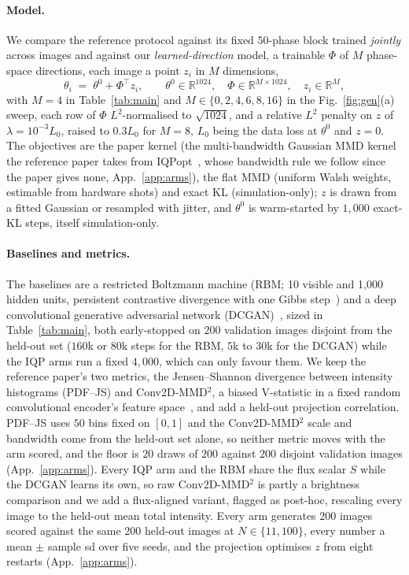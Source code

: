 \documentclass{article}
\begin{document}
\paragraph{Model.}
We compare the reference protocol against its fixed $50$-phase block trained \emph{jointly} across
images and against our \emph{learned-direction} model, a trainable $\Phi$ of $M$ phase-space
directions, each image a point $z_i$ in $M$ dimensions,
\begin{equation}
\theta_i \;=\; \theta^{0} + \Phi^{\!\top} z_i,
\qquad \theta^{0}\in\mathbb{R}^{1024},\quad
\Phi\in\mathbb{R}^{M\times 1024},\quad z_i \in \mathbb{R}^{M},
\label{eq:affine}
\end{equation}
with $M{=}4$ in Table~\ref{tab:main} and $M \in \{0,2,4,6,8,16\}$ in the Fig.~\ref{fig:gen}(a) sweep,
each row of $\Phi$ $L^2$-normalised to $\sqrt{1024}$, and a relative $L^2$ penalty on $z$ of
$\lambda = 10^{-3} L_{0}$, raised to $0.3 L_{0}$ for $M{=}8$, $L_{0}$ being the data loss at
$\theta^{0}$ and $z = 0$. The objectives are the paper kernel (the multi-bandwidth Gaussian
MMD kernel the reference paper takes from IQPopt~\cite{recio_2025_iqpopt}, whose bandwidth rule we
follow since the paper gives none, App.~\ref{app:arms}), the flat MMD (uniform Walsh weights,
estimable from hardware shots) and exact KL (simulation-only); $z$ is drawn from a fitted
Gaussian or resampled with jitter, and $\theta^{0}$ is warm-started by $1{,}000$ exact-KL steps,
itself simulation-only.

\paragraph{Baselines and metrics.}
The baselines are a restricted Boltzmann machine (RBM; 10 visible and 1{,}000 hidden units,
persistent contrastive divergence with one Gibbs
step~\cite{hinton_2002_training,tieleman_2008_training}) and a deep convolutional generative
adversarial network (DCGAN)~\cite{radford_2015_unsupervised}, sized in Table~\ref{tab:main}, both
early-stopped on $200$ validation images disjoint from the held-out set ($160$k or $80$k steps for
the RBM, $5$k to $30$k for the DCGAN) while the IQP arms run a fixed $4{,}000$, which can only favour
them. We keep the reference paper's two metrics, the Jensen--Shannon divergence between
intensity histograms (PDF--JS) and Conv2D-MMD$^2$, a biased V-statistic in a fixed random
convolutional encoder's feature space~\cite{gretton_2012_kernel}, and add a held-out projection
correlation. PDF--JS uses $50$ bins fixed on $[0,1]$ and the Conv2D-MMD$^2$ scale and bandwidth come
from the held-out set alone, so neither metric moves with the arm scored, and the floor is $20$ draws
of $200$ against $200$ disjoint validation images (App.~\ref{app:arms}). Every IQP arm and the RBM
share the
flux scalar $S$ while the DCGAN learns its own, so raw Conv2D-MMD$^2$ is partly a brightness
comparison and we add a flux-aligned variant, flagged as post-hoc, rescaling every image to the
held-out mean total intensity. Every arm generates 200 images scored against the same 200
held-out images at $N \in \{11,100\}$, every number a mean $\pm$ sample sd over five seeds, and the
projection optimises $z$ from eight restarts (App.~\ref{app:arms}).
\end{document}
